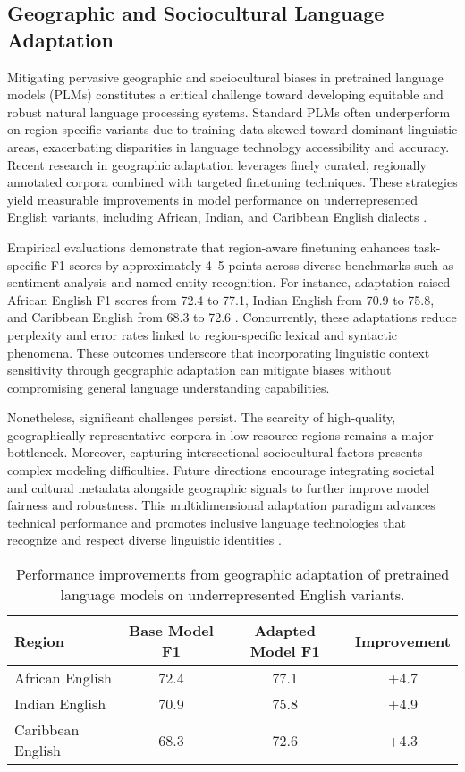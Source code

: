 \documentclass[sigconf]{acmart}
\begin{document}
\subsection{Geographic and Sociocultural Language Adaptation}

Mitigating pervasive geographic and sociocultural biases in pretrained language models (PLMs) constitutes a critical challenge toward developing equitable and robust natural language processing systems. Standard PLMs often underperform on region-specific variants due to training data skewed toward dominant linguistic areas, exacerbating disparities in language technology accessibility and accuracy. Recent research in geographic adaptation leverages finely curated, regionally annotated corpora combined with targeted finetuning techniques. These strategies yield measurable improvements in model performance on underrepresented English variants, including African, Indian, and Caribbean English dialects \cite{ref30}.

Empirical evaluations demonstrate that region-aware finetuning enhances task-specific F1 scores by approximately 4–5 points across diverse benchmarks such as sentiment analysis and named entity recognition. For instance, adaptation raised African English F1 scores from 72.4 to 77.1, Indian English from 70.9 to 75.8, and Caribbean English from 68.3 to 72.6 \cite{ref30}. Concurrently, these adaptations reduce perplexity and error rates linked to region-specific lexical and syntactic phenomena. These outcomes underscore that incorporating linguistic context sensitivity through geographic adaptation can mitigate biases without compromising general language understanding capabilities.

Nonetheless, significant challenges persist. The scarcity of high-quality, geographically representative corpora in low-resource regions remains a major bottleneck. Moreover, capturing intersectional sociocultural factors presents complex modeling difficulties. Future directions encourage integrating societal and cultural metadata alongside geographic signals to further improve model fairness and robustness. This multidimensional adaptation paradigm advances technical performance and promotes inclusive language technologies that recognize and respect diverse linguistic identities \cite{ref30}.

\begin{table*}[htbp]
\centering
\caption{Performance improvements from geographic adaptation of pretrained language models on underrepresented English variants.}
\label{tab:geo_adaptation_results}
\begin{adjustbox}{max width=\textwidth}
\begin{tabular}{@{}lccc@{}}
\toprule
Region & Base Model F1 & Adapted Model F1 & Improvement \\ \midrule
African English & 72.4 & 77.1 & +4.7 \\
Indian English & 70.9 & 75.8 & +4.9 \\
Caribbean English & 68.3 & 72.6 & +4.3 \\ \bottomrule
\end{tabular}
\end{adjustbox}
\end{table*}
\end{document}
